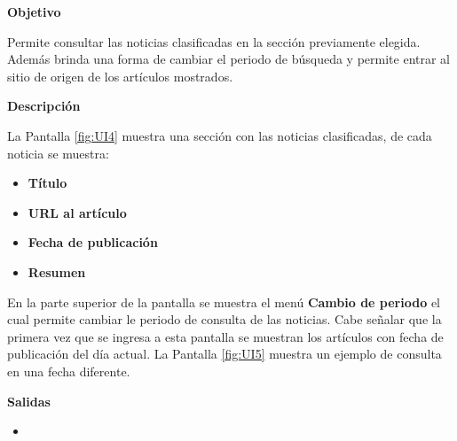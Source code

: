 \begin{large}
  \textbf{Objetivo}\\
\end{large}


Permite consultar las noticias clasificadas en la sección previamente elegida. Además brinda una forma de cambiar el periodo de búsqueda y permite entrar al sitio de origen de los artículos mostrados.\\

\begin{large}
  \textbf{Descripción}\\
\end{large}

La Pantalla \ref{fig:UI4} muestra una sección con las noticias clasificadas, de cada noticia se muestra:

\begin{itemize}

  \item \textbf{Título}
  \item \textbf{URL al artículo}
  \item \textbf{Fecha de publicación}
  \item \textbf{Resumen}

\end{itemize}

En la parte superior de la pantalla se muestra el menú \textbf{Cambio de periodo} el cual permite cambiar le periodo de consulta de las noticias. Cabe señalar que la primera vez que se ingresa a esta pantalla se muestran los artículos con fecha de publicación del día actual.
La Pantalla \ref{fig:UI5} muestra un ejemplo de consulta en una fecha diferente.



\begin{large}
  \textbf{Salidas}
\end{large}

\begin{itemize}

  \item {}

\end{itemize}


